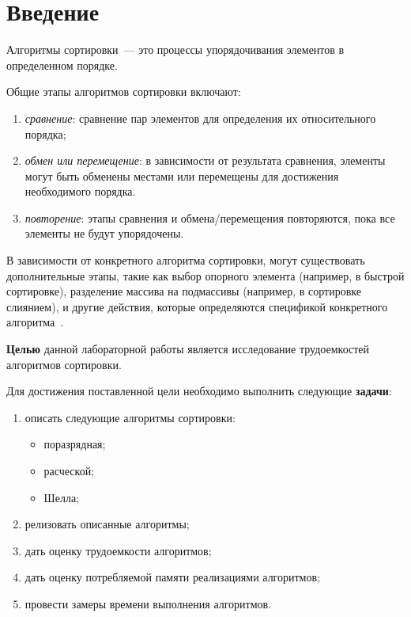 \chapter*{Введение}

Алгоритмы сортировки~--- это процессы упорядочивания элементов в определенном порядке.

Общие этапы алгоритмов сортировки включают:
\begin{enumerate}
    \item \textit{сравнение}: сравнение пар элементов для определения их относительного порядка;
    \item \textit{обмен или перемещение}: в зависимости от результата сравнения, элементы могут быть обменены местами или перемещены для достижения необходимого порядка.
    \item \textit{повторение}: этапы сравнения и обмена/перемещения повторяются, пока все элементы не будут упорядочены.
\end{enumerate}

В зависимости от конкретного алгоритма сортировки, могут существовать дополнительные этапы, такие как выбор опорного элемента (например, в быстрой сортировке), разделение массива на подмассивы (например, в сортировке слиянием), и другие действия, которые определяются спецификой конкретного алгоритма~\cite{knut}.

\textbf{Целью} данной лабораторной работы является исследование трудоемкостей алгоритмов сортировки.

Для достижения поставленной цели необходимо выполнить следующие \textbf{задачи}:
\begin{enumerate}[label={\arabic*)}]
    \item описать следующие алгоритмы сортировки:
        \begin{itemize}
            \item поразрядная;
            \item расческой;
            \item Шелла;
        \end{itemize}
    \item релизовать описанные алгоритмы;
    \item дать оценку трудоемкости алгоритмов;
    \item дать оценку потребляемой памяти реализациями алгоритмов;
    \item провести замеры времени выполнения алгоритмов.
\end{enumerate}
